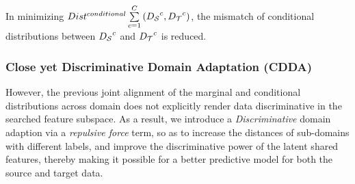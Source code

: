 \documentclass[journal,twocolumn]{IEEEtran}
\begin{document}
\begin{CJK*}{UTF8}{gkai}
		
In minimizing ${Dis{t^{conditional}}\sum\limits_{c = 1}^C {({D_{\cal S}}^c,{D_{\cal T}}^c)} }$,  the mismatch of conditional distributions between ${{D_{\cal S}}^c}$ and ${{D_{\cal T}}^c}$ is reduced. 
		
		
\subsubsection{Close yet Discriminative Domain Adaptation (\textbf{CDDA})}\label{subsubsection:Discriminative DA}
	
However, the previous joint alignment of the marginal and conditional distributions across domain does not explicitly render data discriminative  in the searched feature subspace. As a result, we introduce a  \textit{Discriminative} domain adaption via a \textit{repulsive force} term, so as to increase the distances of sub-domains with different labels, and improve the discriminative power of the latent shared features, thereby making it possible for a better predictive model for both the source and target data. 
    

\end{CJK*}
\end{document}
